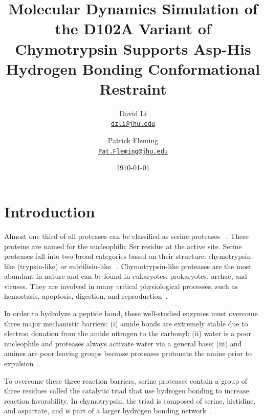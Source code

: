 \documentclass[11pt, twocolumn]{article}
\begin{document}
\title{Molecular Dynamics Simulation of the D102A Variant of Chymotrypsin
Supports Asp-His Hydrogen Bonding Conformational Restraint}
\author{David Li\\\href{mailto:dzli@jhu.edu}{\nolinkurl{dzli@jhu.edu}}
\and Patrick Fleming\\\href{mailto:Pat.Fleming@jhu.edu}{\nolinkurl{Pat.Fleming@jhu.edu}}}
\date{\today}
\maketitle

\section{Introduction}
Almost one third of all proteases can be classified as serine proteases
~\cite{hedstrom02}. These proteins are named for the nucleophilic Ser
residue at the active site. Serine proteases fall into two broad categories
based on their structure: chymotrypsin-like (trypsin-like) or subtilisin-like
~\cite{madala10}. Chymotrypsin-like proteases are the most abundant in
nature and can be found in eukaryotes, prokaryotes, archae, and viruses. They
are involved in many critical physiological processes, such as hemostasis,
apoptosis, digestion, and reproduction~\cite{hedstrom02}.

In order to hydrolyze a peptide bond, these well-studied enzymes must overcome
three major mechanistic barriers: (i) amide bonds are extremely stable due to
electron donation from the amide nitrogen to the carbonyl; (ii) water is a poor
nucleophile and proteases always activate water via a general base; (iii) and
amines are poor leaving groups because proteases protonate the amine prior to
expulsion~\cite{hedstrom02}.

To overcome these three reaction barriers, serine proteases contain a group
of three residues called the catalytic triad that use hydrogen bonding to
increase reaction favorability. In chymotrypsin, the triad is composed of
serine, histidine, and aspartate, and is part of a larger hydrogen bonding
network~\cite{hedstrom02}.
\end{document}

